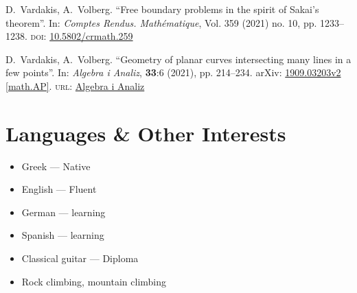 \documentclass[12pt]{article}
\begin{document}
D.~Vardakis, A.~Volberg.
\enquote{Free boundary problems in the spirit of Sakai’s theorem}.
In: \emph{Comptes Rendus. Math{\'e}matique}, Vol. 359 (2021) no. 10, pp. 1233--1238.
\textsc{doi}: \href{https://doi.org/10.5802/crmath.259}{10.5802/crmath.259} %
\smallskip

D.~Vardakis, A.~Volberg.
\enquote{Geometry of planar curves intersecting many lines in a few points}.
In: \emph{Algebra i Analiz}, \textbf{33}:6 (2021), pp. 214--234.
arXiv: \href{https://arxiv.org/abs/1909.03203v2}{1909.03203v2 [math.AP]}.
\textsc{url}: \href{http://mi.mathnet.ru/eng/aa/v33/i6/p214}{Algebra i Analiz}


\section*{Languages \& Other Interests}

\begin{multicols}{2}
	\begin{itemize}
		\item Greek --- Native
		\item English --- Fluent
		\item German --- learning
		\item Spanish --- learning
		\item Classical guitar --- Diploma
		\item Rock climbing, mountain climbing
	\end{itemize}
\end{multicols}
\end{document}
